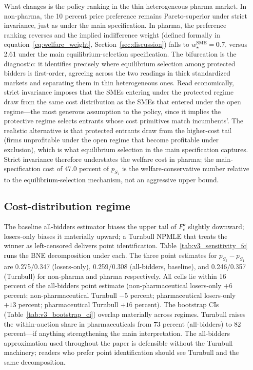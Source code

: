 What changes is the policy ranking in the thin heterogeneous pharma market. In non-pharma, the 10 percent price preference remains Pareto-superior under strict invariance, just as under the main specification. In pharma, the preference ranking reverses and the implied indifference weight (defined formally in equation~\eqref{eq:welfare_weight}, Section~\ref{sec:discussion}) falls to $w^{\text{SME}}_\star = 0.7$, versus 2.61 under the main equilibrium-selection specification. The bifurcation is the diagnostic: it identifies precisely where equilibrium selection among protected bidders is first-order, agreeing across the two readings in thick standardized markets and separating them in thin heterogeneous ones. Read economically, strict invariance imposes that the SMEs entering under the protected regime draw from the same cost distribution as the SMEs that entered under the open regime---the most generous assumption to the policy, since it implies the protective regime selects entrants whose cost primitives match incumbents'. The realistic alternative is that protected entrants draw from the higher-cost tail (firms unprofitable under the open regime that become profitable under exclusion), which is what equilibrium selection in the main specification captures. Strict invariance therefore understates the welfare cost in pharma; the main-specification cost of 47.0 percent of $p_{S_1}$ is the welfare-conservative number relative to the equilibrium-selection mechanism, not an aggressive upper bound.

\subsection{Cost-distribution regime}

The baseline all-bidders estimator biases the upper tail of $F_c^k$ slightly downward; losers-only biases it materially upward; a Turnbull NPMLE that treats the winner as left-censored delivers point identification. Table~\ref{tab:v3_sensitivity_fc} runs the BNE decomposition under each. The three point estimates for $p_{S_3} - p_{S_1}$ are 0.275/0.347 (losers-only), 0.259/0.308 (all-bidders, baseline), and 0.246/0.357 (Turnbull) for non-pharma and pharma respectively. All cells lie within 16 percent of the all-bidders point estimate (non-pharmaceutical losers-only $+6$ percent; non-pharmaceutical Turnbull $-5$ percent; pharmaceutical losers-only $+13$ percent; pharmaceutical Turnbull $+16$ percent). The bootstrap CIs (Table~\ref{tab:v3_bootstrap_ci}) overlap materially across regimes. Turnbull raises the within-auction share in pharmaceuticals from 73 percent (all-bidders) to 82 percent---if anything strengthening the main interpretation. The all-bidders approximation used throughout the paper is defensible without the Turnbull machinery; readers who prefer point identification should see Turnbull and the same decomposition.


